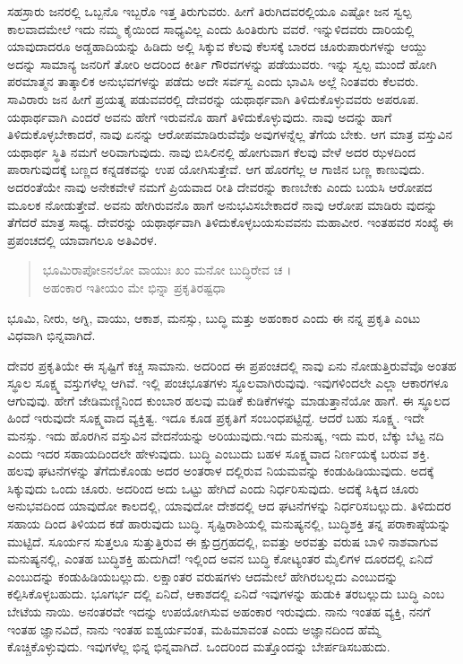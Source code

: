 ಸಹಸ್ರಾರು ಜನರಲ್ಲಿ ಒಬ್ಬನೊ ಇಬ್ಬರೊ ಇತ್ತ ತಿರುಗುವರು. ಹೀಗೆ ತಿರುಗಿದವರಲ್ಲಿಯೂ ಎಷ್ಟೋ ಜನ ಸ್ವಲ್ಪ ಕಾಲವಾದಮೇಲೆ ಇದು ನಮ್ಮ ಕೈಯಿಂದ ಸಾಧ್ಯವಿಲ್ಲ ಎಂದು ಹಿಂತಿರುಗು ವವರೆ. ಇನ್ನುಳಿದವರು ದಾರಿಯಲ್ಲಿ ಯಾವುದಾದರೂ ಅಡ್ಡಹಾದಿಯನ್ನು ಹಿಡಿದು ಅಲ್ಲಿ ಸಿಕ್ಕುವ ಕೆಲವು ಕೆಲಸಕ್ಕೆ ಬಾರದ ಚೂರುಪಾರುಗಳನ್ನು ಆಯ್ದು ಅದನ್ನು ಸಾಮಾನ್ಯ ಜನರಿಗೆ ತೋರಿ ಅದರಿಂದ ಕೀರ್ತಿ ಗೌರವಗಳನ್ನು ಪಡೆಯುವರು. ಇನ್ನು ಸ್ವಲ್ಪ ಮುಂದೆ ಹೋಗಿ ಪರಮಾತ್ಮನ ತಾತ್ಕಾಲಿಕ ಅನುಭವಗಳನ್ನು ಪಡೆದು ಅದೇ ಸರ್ವಸ್ವ ಎಂದು ಭಾವಿಸಿ ಅಲ್ಲೆ ನಿಂತವರು ಕೆಲವರು. ಸಾವಿರಾರು ಜನ ಹೀಗೆ ಪ್ರಯತ್ನ ಪಡುವವರಲ್ಲಿ ದೇವರನ್ನು ಯಥಾರ್ಥವಾಗಿ ತಿಳಿದುಕೊಳ್ಳುವವರು ಅಪರೂಪ. ಯಥಾರ್ಥವಾಗಿ ಎಂದರೆ ಅವನು ಹೇಗೆ ಇರುವನೊ ಹಾಗೆ ತಿಳಿದುಕೊಳ್ಳುವುದು. ನಾವು ಅದನ್ನು ಹಾಗೆ ತಿಳಿದುಕೊಳ್ಳಬೇಕಾದರೆ, ನಾವು ಏನನ್ನು ಆರೋಪಮಾಡಿರುವೆವೊ ಅವುಗಳನ್ನೆಲ್ಲ ತೆಗೆಯ ಬೇಕು. ಆಗ ಮಾತ್ರ ವಸ್ತುವಿನ ಯಥಾರ್ಥ ಸ್ಥಿತಿ ನಮಗೆ ಅರಿವಾಗುವುದು. ನಾವು ಬಿಸಿಲಿನಲ್ಲಿ ಹೋಗುವಾಗ ಕೆಲವು ವೇಳೆ ಅದರ ಝಳದಿಂದ ಪಾರಾಗುವುದಕ್ಕೆ ಬಣ್ಣದ ಕನ್ನಡಕವನ್ನು ಉಪ ಯೋಗಿಸುತ್ತೇವೆ. ಆಗ ಹೊರಗೆಲ್ಲ ಆ ಗಾಜಿನ ಬಣ್ಣ ಕಾಣುವುದು. ಅದರಂತೆಯೇ ನಾವು ಅನೇಕವೇಳೆ ನಮಗೆ ಪ್ರಿಯವಾದ ರೀತಿ ದೇವರನ್ನು ಕಾಣಬೇಕು ಎಂದು ಬಯಸಿ ಆರೋಪದ ಮೂಲಕ ನೋಡುತ್ತೇವೆ. ಅವನು ಹೇಗಿರುವನೊ ಹಾಗೆ ಅನುಭವಿಸಬೇಕಾದರೆ ನಾವು ಆರೋಪ ಮಾಡಿರು ವುದನ್ನು ತೆಗೆದರೆ ಮಾತ್ರ ಸಾಧ್ಯ. ದೇವರನ್ನು ಯಥಾರ್ಥವಾಗಿ ತಿಳಿದುಕೊಳ್ಳಬಯಸುವವನು ಮಹಾವೀರ. ಇಂತಹವರ ಸಂಖ್ಯೆ ಈ ಪ್ರಪಂಚದಲ್ಲಿ ಯಾವಾಗಲೂ ಅತಿವಿರಳ.

\begin{verse}
ಭೂಮಿರಾಪೋಽನಲೋ ವಾಯುಃ ಖಂ ಮನೋ ಬುದ್ಧಿರೇವ ಚ ।\\ಅಹಂಕಾರ ಇತೀಯಂ ಮೇ ಭಿನ್ನಾ ಪ್ರಕೃತಿರಷ್ಟಧಾ 
\end{verse}

{\small ಭೂಮಿ, ನೀರು, ಅಗ್ನಿ, ವಾಯು, ಆಕಾಶ, ಮನಸ್ಸು, ಬುದ್ಧಿ ಮತ್ತು ಅಹಂಕಾರ ಎಂದು ಈ ನನ್ನ ಪ್ರಕೃತಿ ಎಂಟು ವಿಧವಾಗಿ ಭಿನ್ನವಾಗಿದೆ.}

ದೇವರ ಪ್ರಕೃತಿಯೇ ಈ ಸೃಷ್ಟಿಗೆ ಕಚ್ಚ ಸಾಮಾನು. ಅದರಿಂದ ಈ ಪ್ರಪಂಚದಲ್ಲಿ ನಾವು ಏನು ನೋಡುತ್ತಿರುವೆವೊ ಅಂತಹ ಸ್ಥೂಲ ಸೂಕ್ಷ್ಮ ವಸ್ತುಗಳೆಲ್ಲ ಆಗಿವೆ. ಇಲ್ಲಿ ಪಂಚಭೂತಗಳು ಸ್ಥೂಲವಾಗಿರುವುವು. ಇವುಗಳಿಂದಲೇ ಎಲ್ಲಾ ಆಕಾರಗಳೂ ಆಗುವುವು. ಹೇಗೆ ಜೇಡಿಮಣ್ಣಿನಿಂದ ಕುಂಬಾರ ಹಲವು ಮಡಿಕೆ ಕುಡಿಕೆಗಳನ್ನು ಮಾಡುತ್ತಾನೆಯೋ ಹಾಗೆ. ಈ ಸ್ಥೂಲದ ಹಿಂದೆ ಇರುವುದೇ ಸೂಕ್ಷ್ಮವಾದ ವ್ಯಕ್ತಿತ್ವ. ಇದೂ ಕೂಡ ಪ್ರಕೃತಿಗೆ ಸಂಬಂಧಪಟ್ಟಿದ್ದೆ. ಆದರೆ ಬಹು ಸೂಕ್ಷ್ಮ. ಇದೇ ಮನಸ್ಸು. ಇದು ಹೊರಗಿನ ವಸ್ತುವಿನ ವೇದನೆಯನ್ನು ಅರಿಯುವುದು.ಇದು ಮನುಷ್ಯ, ಇದು ಮರ, ಬೆಕ್ಕು ಬೆಟ್ಟ ನದಿ ಎಂದು ಇದರ ಸಹಾಯದಿಂದಲೇ ಹೇಳುವುದು. ಬುದ್ಧಿ ಎಂಬುದು ಬಹಳ ಸೂಕ್ಷ್ಮವಾದ ನಿರ್ಣಯಕ್ಕೆ ಬರುವ ಶಕ್ತಿ. ಹಲವು ಘಟನೆಗಳನ್ನು ತೆಗೆದುಕೊಂಡು ಅದರ ಅಂತರಾಳ ದಲ್ಲಿರುವ ನಿಯಮವನ್ನು ಕಂಡುಹಿಡಿಯುವುದು. ಅದಕ್ಕೆ ಸಿಕ್ಕುವುದು ಒಂದು ಚೂರು. ಅದರಿಂದ ಅದು ಒಟ್ಟು ಹೇಗಿದೆ ಎಂದು ನಿರ್ಧರಿಸುವುದು. ಅದಕ್ಕೆ ಸಿಕ್ಕಿದ ಚೂರು ಅನುಭವದಿಂದ ಯಾವುದೋ ಕಾಲದಲ್ಲಿ, ಯಾವುದೋ ದೇಶದಲ್ಲಿ ಆದ ಘಟನೆಗಳನ್ನು ನಿರ್ಧರಿಸಬಲ್ಲುದು. ತಿಳಿದುದರ ಸಹಾಯ ದಿಂದ ತಿಳಿಯದ ಕಡೆ ಹಾರುವುದು ಬುದ್ಧಿ. ಸೃಷ್ಟಿರಾಶಿಯಲ್ಲಿ ಮನುಷ್ಯನಲ್ಲಿ, ಬುದ್ಧಿಶಕ್ತಿ ತನ್ನ ಪರಾಕಾಷ್ಠೆಯನ್ನು ಮುಟ್ಟಿದೆ. ಸೂರ್ಯನ ಸುತ್ತಲೂ ಸುತ್ತುತ್ತಿರುವ ಈ ಕ್ಷುದ್ರಗ್ರಹದಲ್ಲಿ, ಐವತ್ತು ಅರವತ್ತು ವರುಷ ಬಾಳಿ ನಾಶವಾಗುವ ಮನುಷ್ಯನಲ್ಲಿ, ಎಂತಹ ಬುದ್ಧಿಶಕ್ತಿ ಹುದುಗಿದೆ! ಇಲ್ಲಿಂದ ಅವನ ಬುದ್ಧಿ ಕೋಟ್ಯಂತರ ಮೈಲಿಗಳ ದೂರದಲ್ಲಿ ಏನಿದೆ ಎಂಬುದನ್ನು ಕಂಡುಹಿಡಿಯಬಲ್ಲುದು. ಲಕ್ಷಾಂತರ ವರುಷಗಳು ಆದಮೇಲೆ ಹೇಗಿರಬಲ್ಲದು ಎಂಬುದನ್ನು ಕಲ್ಪಿಸಿಕೊಳ್ಳಬಹುದು. ಭೂಗರ್ಭ ದಲ್ಲಿ ಏನಿದೆ, ಆಕಾಶದಲ್ಲಿ ಏನಿದೆ ಇವುಗಳನ್ನು ಹುಡುಕಿ ತರಬಲ್ಲುದು ಬುದ್ಧಿ ಎಂಬ ಬೇಟೆಯ ನಾಯಿ. ಅನಂತರವೇ ಇದನ್ನು ಉಪಯೋಗಿಸುವ ಅಹಂಕಾರ ಇರುವುದು. ನಾನು ಇಂತಹ ವ್ಯಕ್ತಿ, ನನಗೆ ಇಂತಹ ಜ್ಞಾನವಿದೆ, ನಾನು ಇಂತಹ ಐಶ್ವರ್ಯವಂತ, ಮಹಿಮಾವಂತ ಎಂದು ಅಜ್ಞಾನದಿಂದ ಹೆಮ್ಮೆ ಕೊಚ್ಚಿಕೊಳ್ಳುವುದು. ಇವುಗಳೆಲ್ಲ ಭಿನ್ನ ಭಿನ್ನವಾಗಿದೆ. ಒಂದರಿಂದ ಮತ್ತೊಂದನ್ನು ಬೇರ್ಪಡಿಸಬಹುದು.

